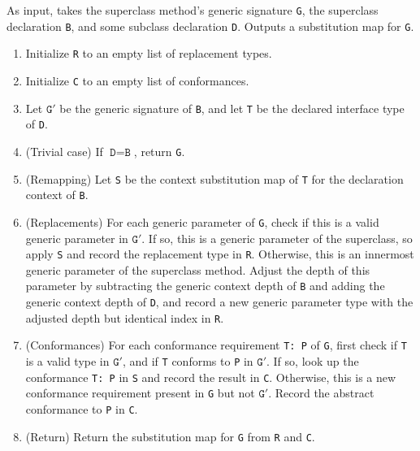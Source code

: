 \documentclass[../generics]{subfiles}
\begin{document}
\begin{algorithm}\label{superclass attaching map} As input, takes the superclass method's generic signature \texttt{G}, the superclass declaration \texttt{B}, and some subclass declaration \texttt{D}. Outputs a substitution map for \texttt{G}.
\begin{enumerate}
\item Initialize \texttt{R} to an empty list of replacement types.
\item Initialize \texttt{C} to an empty list of conformances.
\item Let $\texttt{G}'$ be the generic signature of \texttt{B}, and let \texttt{T} be the declared interface type of \texttt{D}.
\item (Trivial case) If $\texttt{D}=\texttt{B}$, return \texttt{G}.
\item (Remapping) Let \texttt{S} be the context substitution map of \texttt{T} for the declaration context of \texttt{B}.
\item (Replacements) For each generic parameter of \texttt{G}, check if this is a valid generic parameter in $\texttt{G}'$. If so, this is a generic parameter of the superclass, so apply \texttt{S} and record the replacement type in \texttt{R}. Otherwise, this is an innermost generic parameter of the superclass method. Adjust the depth of this parameter by subtracting the generic context depth of \texttt{B} and adding the generic context depth of \texttt{D}, and record a new generic parameter type with the adjusted depth but identical index in \texttt{R}.

\item (Conformances) For each conformance requirement \texttt{T:\ P} of \texttt{G}, first check if \texttt{T} is a valid type in $\texttt{G}'$, and if \texttt{T} conforms to \texttt{P} in $\texttt{G}'$. If so, look up the conformance \texttt{T:\ P} in \texttt{S} and record the result in \texttt{C}. Otherwise, this is a new conformance requirement present in \texttt{G} but not $\texttt{G}'$. Record the abstract conformance to \texttt{P} in \texttt{C}.

\item (Return) Return the substitution map for \texttt{G} from \texttt{R} and \texttt{C}.
\end{enumerate}
\end{algorithm}
\end{document}
